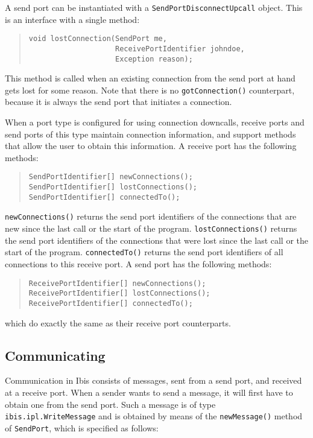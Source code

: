 \documentclass[10pt]{article}
\newcommand{\mysubsection}[1]{\subsection{#1}\label{#1}}
\begin{document}
A send port can be instantiated with a
\texttt{SendPortDisconnectUpcall} object.
This is an interface with a single method:

{\small
\begin{quote}
\begin{verbatim}
void lostConnection(SendPort me,
                    ReceivePortIdentifier johndoe,
                    Exception reason);
\end{verbatim}
\end{quote}
}
\noindent 
This method is called when an existing connection from the send port at
hand gets lost for some reason. Note that there is no \texttt{gotConnection()}
counterpart, because it is always the send port that initiates a connection.

When a port type is configured for using connection downcalls, receive ports
and send ports of this type maintain connection information, and support
methods that allow the user to obtain this information.
A receive port has the following methods:

{\small
\begin{quote}
\begin{verbatim}
SendPortIdentifier[] newConnections();
SendPortIdentifier[] lostConnections();
SendPortIdentifier[] connectedTo();
\end{verbatim}
\end{quote}
}

\texttt{newConnections()} returns the send port identifiers of the connections
that are new since the last call or the start of the program.
\texttt{lostConnections()} returns the send port identifiers of the connections
that were lost since the last call or the start of the program.
\texttt{connectedTo()} returns the send port identifiers of all connections
to this receive port.
A send port has the following methods:

{\small
\begin{quote}
\begin{verbatim}
ReceivePortIdentifier[] newConnections();
ReceivePortIdentifier[] lostConnections();
ReceivePortIdentifier[] connectedTo();
\end{verbatim}
\end{quote}
}
\noindent
which do exactly the same as their receive port counterparts.

\mysubsection{Communicating}

Communication in Ibis
consists of messages, sent from a send port, and received at a
receive port. When a sender wants to send a message, it will first
have to obtain one from the send port. Such a message is of
type \texttt{ibis.ipl.WriteMessage} and is obtained by means of
the \texttt{newMessage()} method of \texttt{SendPort}, which is specified
as follows:
\end{document}
